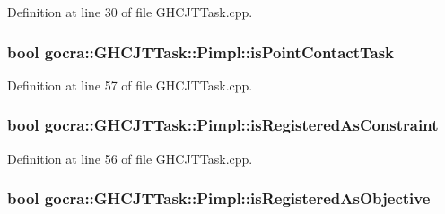 Definition at line 30 of file G\+H\+C\+J\+T\+Task.\+cpp.

\subsubsection[{\texorpdfstring{is\+Point\+Contact\+Task}{isPointContactTask}}]{\setlength{\rightskip}{0pt plus 5cm}bool gocra\+::\+G\+H\+C\+J\+T\+Task\+::\+Pimpl\+::is\+Point\+Contact\+Task}\hypertarget{structgocra_1_1GHCJTTask_1_1Pimpl_a900c0b0bf150ba085a300ff543054a36}{}\label{structgocra_1_1GHCJTTask_1_1Pimpl_a900c0b0bf150ba085a300ff543054a36}


Definition at line 57 of file G\+H\+C\+J\+T\+Task.\+cpp.

\subsubsection[{\texorpdfstring{is\+Registered\+As\+Constraint}{isRegisteredAsConstraint}}]{\setlength{\rightskip}{0pt plus 5cm}bool gocra\+::\+G\+H\+C\+J\+T\+Task\+::\+Pimpl\+::is\+Registered\+As\+Constraint}\hypertarget{structgocra_1_1GHCJTTask_1_1Pimpl_aace8728a2e9a0271ea89aea0355c036b}{}\label{structgocra_1_1GHCJTTask_1_1Pimpl_aace8728a2e9a0271ea89aea0355c036b}


Definition at line 56 of file G\+H\+C\+J\+T\+Task.\+cpp.

\subsubsection[{\texorpdfstring{is\+Registered\+As\+Objective}{isRegisteredAsObjective}}]{\setlength{\rightskip}{0pt plus 5cm}bool gocra\+::\+G\+H\+C\+J\+T\+Task\+::\+Pimpl\+::is\+Registered\+As\+Objective}\hypertarget{structgocra_1_1GHCJTTask_1_1Pimpl_ac3772fc7a816ef1ba5ac40b79908d225}{}\label{structgocra_1_1GHCJTTask_1_1Pimpl_ac3772fc7a816ef1ba5ac40b79908d225}


